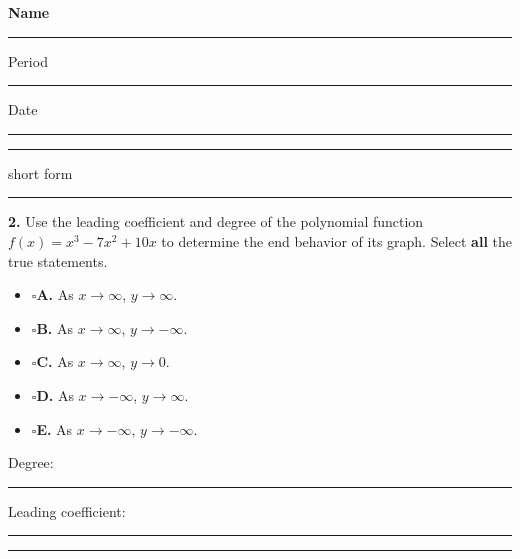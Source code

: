 \documentclass[11pt]{article}
\newcommand{\checkbox}{$\square$\;}
\begin{document}
\noindent\textbf{Name}\; \rule{6cm}{0.4pt} \hfill Period \rule{1.2cm}{0.4pt} \quad Date \rule{2.2cm}{0.4pt}

\vspace{4pt}\noindent\rule{\textwidth}{0.6pt}

\vspace{2pt} \hfill {\small short form}

\vspace{4pt}\noindent\rule{\textwidth}{0.6pt}


\vspace{2pt}
\textbf{2.} Use the leading coefficient and degree of the polynomial function $f(x)=x^3-7x^2+10x$ to determine the end behavior of its graph. Select \textbf{all} the true statements.

\vspace{4pt}
\begin{itemize}[leftmargin=1.2em, itemsep=2pt]
\item[] \checkbox \textbf{A.} As $x\to\infty$, $y\to\infty$.
\item[] \checkbox \textbf{B.} As $x\to\infty$, $y\to-\infty$.
\item[] \checkbox \textbf{C.} As $x\to\infty$, $y\to0$.
\item[] \checkbox \textbf{D.} As $x\to-\infty$, $y\to\infty$.
\item[] \checkbox \textbf{E.} As $x\to-\infty$, $y\to-\infty$.
\end{itemize}

\vspace{4pt}
Degree: \rule{1.2cm}{0.4pt} \qquad Leading coefficient: \rule{1.2cm}{0.4pt}

\vspace{4pt}\noindent\rule{\textwidth}{0.4pt}
\end{document}

